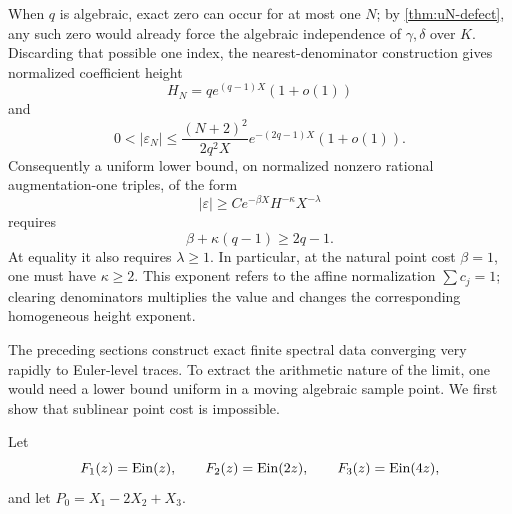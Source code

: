 When \(q\) is algebraic, exact zero can occur for at most one \(N\); by
\cref{thm:uN-defect}, any such zero would already force the algebraic
independence of \(\gamma,\delta\) over \(K\).  Discarding that possible one
index, the nearest-denominator construction gives normalized coefficient
height
\[
 H_N=q e^{(q-1)X}(1+o(1))
\]
and
\begin{equation}\label{eq:critical-height-upper}
 0<|\varepsilon_N|
 \le\frac{(N+2)^2}{2q^2X}
 e^{-(2q-1)X}(1+o(1)).
\end{equation}
Consequently a uniform lower bound, on normalized nonzero rational
augmentation-one triples, of the form
\[
 |\varepsilon|\ge C e^{-\beta X}H^{-\kappa}X^{-\lambda}
\]
requires
\begin{equation}\label{eq:height-frontier}
 \boxed{\beta+\kappa(q-1)\ge2q-1.}
\end{equation}
At equality it also requires \(\lambda\ge1\).  In particular, at the natural
point cost \(\beta=1\), one must have \(\kappa\ge2\).  This exponent refers
to the affine normalization \(\sum c_j=1\); clearing denominators multiplies
the value and changes the corresponding homogeneous height exponent.

The preceding sections construct exact finite spectral data converging very
rapidly to Euler-level traces.  To extract the arithmetic nature of the
limit, one would need a lower bound uniform in a moving algebraic sample
point.  We first show that sublinear point cost is impossible.

Let
\[
 F_1(z)=\operatorname{Ein}(z),\qquad
 F_2(z)=\operatorname{Ein}(2z),\qquad
 F_3(z)=\operatorname{Ein}(4z),
\]
and let \(P_0=X_1-2X_2+X_3\).

